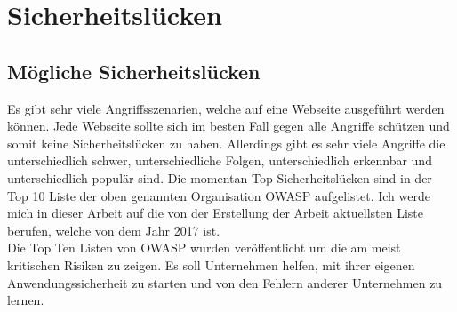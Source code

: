 \chapter{Sicherheitslücken}
\section{Mögliche Sicherheitslücken}
Es gibt sehr viele Angriffsszenarien, welche auf eine Webseite ausgeführt werden können. Jede Webseite sollte sich im besten Fall gegen alle Angriffe schützen und somit keine Sicherheitslücken zu haben. Allerdings gibt es sehr viele Angriffe die unterschiedlich schwer, unterschiedliche Folgen, unterschiedlich erkennbar und unterschiedlich populär sind. Die momentan Top Sicherheitslücken sind in der Top 10 Liste der oben genannten Organisation OWASP aufgelistet. Ich werde mich in dieser Arbeit auf die von der Erstellung der Arbeit aktuellsten Liste berufen, welche von dem Jahr 2017 ist. \\
Die Top Ten Listen von OWASP wurden veröffentlicht um die am meist kritischen Risiken zu zeigen. Es soll Unternehmen helfen, mit ihrer eigenen Anwendungssicherheit zu starten und von den Fehlern anderer Unternehmen zu lernen. 
